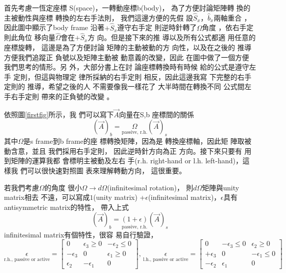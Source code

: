 \documentclass[12pt,twoside]{article}
\begin{document}
首先考慮一恆定座標%
S(space)，一轉動座標b(body)，%
為了方便討論矩陣轉%
換的主被動性與座標%
轉換的左右手法則，%
我們這邊方便的先假%
設$\hat{S}_{x}， \hat{b}_{x}$兩軸重合%
，因此圖中顯示了body frame%
沿著$+\hat{S}_{x}$遵守右手定%
則逆時針轉了$\Omega $角度%
，依右手定則此角位%
移向量$\hat{\Omega}$會在$+\hat{S}_{x}$方%
向。但是接下來的推%
導以及所有公式都適%
用任意的座標旋轉，%
這邊是為了方便討論%
矩陣的主動被動的方%
向性，以及在之後的%
推導方便我們追蹤正%
負號以及矩陣主動被%
動意義的改變，因此%
在圖中做了一個方便%
我們思考的情形。另%
外，大部分書上在討%
論座標轉換時有時候%
給的公式是遵守左手%
定則，但這與物理定%
律所採納的右手定則%
相反，因此這邊我寫%
下完整的右手定則的%
推導，希望之後的人%
不需要像我一樣花了%
大半時間在轉換不同%
公式間左手右手定則%
帶來的正負號的改變%
。

依照圖\ref{firstfig}所示，我%
們可以寫下$\vec{A}$向量在S,b%
座標間的關係%
\begin{equation*}
\left( \vec{A}\right) _{b}=\underset{\text{passive, r.h.}}{\Omega }\left( 
\vec{A}\right) _{s}
\end{equation*}%
其中$\Omega $是s frame到b frame的座%
標轉換矩陣，因為是%
轉換座標軸，因此矩%
陣取被動含意，並且%
我們採用右手定則，%
因此逆時針方向為正%
方向。接下來只要有%
用到矩陣的運算我都%
會標明主被動及左右%
手(r.h. right-hand or l.h. left-hand)，這樣我%
們可以很快速對照圖%
表來理解轉動方向，%
這很重要。

若我們考慮$\Omega $的角度%
很小$\Omega \rightarrow d\Omega $(infinitesimal rotation)，%
則$d\Omega $矩陣與unity matrix相去%
不遠，可以寫成$1$(unity matrix) +$%
\epsilon $(infinitesimal matrix)，$\epsilon $具有%
antisymmetric matrix的特性\cite[p. 169]{goldstein}，%
帶入上式%
\begin{equation*}
\left( \vec{A}\right) _{b}=\underset{\text{passive, r.h.}}{\left( 1+\epsilon
\right) }\left( \vec{A}\right) _{s}
\end{equation*}%
infinitesimal matrix有個特性，很容%
易自行驗證，%
\begin{equation*}
\underset{\text{r.h., passive or active}}{\epsilon }=\left[ 
\begin{array}{ccc}
0 & \epsilon _{3}\geq 0 & -\epsilon _{2}\leq 0 \\ 
-\epsilon _{3} & 0 & \epsilon _{1}\geq 0 \\ 
\epsilon _{2} & -\epsilon _{1} & 0%
\end{array}%
\right] \text{, }\underset{\text{l.h., passive or active}}{\epsilon }=\left[ 
\begin{array}{ccc}
0 & -\epsilon _{3}\leq 0 & \epsilon _{2}\geq 0 \\ 
+\epsilon _{3} & 0 & -\epsilon _{1}\leq 0 \\ 
-\epsilon _{2} & \epsilon _{1} & 0%
\end{array}%
\right]
\end{equation*}
\end{document}
